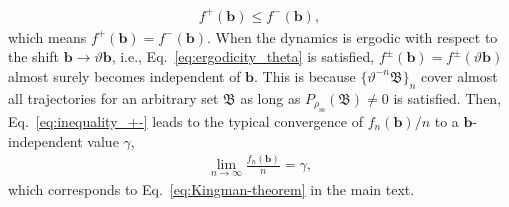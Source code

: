 \documentclass[preprint,pteplogo]{ptephy_v2}%
\numberwithin{equation}{section}
\theoremstyle{definition}
\begin{document}
\begin{align}
    f^+(\bm{b}) \leq f^-(\bm{b}),
    \label{eq:inequality_+-}
\end{align}
which means $f^+(\bm{b})=f^-(\bm{b})$. 
When the dynamics is ergodic with respect to the shift $\bm{b}\rightarrow\vartheta\bm{b}$, i.e., Eq.~\eqref{eq:ergodicity_theta} is satisfied, $f^\pm(\bm{b})=f^\pm(\vartheta\bm{b})$ almost surely becomes independent of $\bm{b}$. 
This is because $\{\vartheta^{-n}\mathfrak{B}\}_n$ cover almost all trajectories for an arbitrary set $\mathfrak{B}$ as long as $P_{\rho_\mathrm{ss}}(\mathfrak{B})\neq0$ is satisfied. 
Then, Eq.~\eqref{eq:inequality_+-} leads to the typical convergence of $f_n(\bm{b})/n$ to a $\bm{b}$-independent value $\gamma$,
\begin{align}
    \lim_{n\rightarrow\infty}\frac{f_n(\bm{b})}{n}=\gamma,
\end{align}
which corresponds to Eq.~\eqref{eq:Kingman-theorem} in the main text. 

\end{document}
